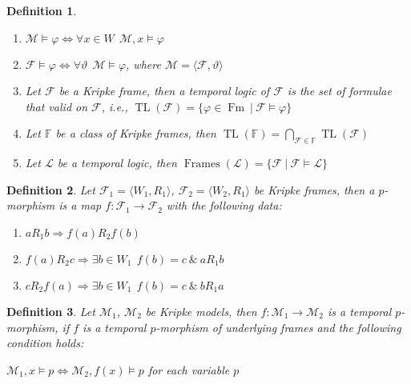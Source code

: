 \documentclass[a4paper]{article}
\theoremstyle{defin}
\newtheorem{defin}{Definition}
\theoremstyle{theorem}
\theoremstyle{prop}
\theoremstyle{lemma}
\theoremstyle{ex}
\theoremstyle{col}
\begin{document}
\begin{defin}
  $ $

  \begin{enumerate}
    \item $\mathcal{M} \models \varphi \Leftrightarrow \forall x \in W \:\: \mathcal{M}, x \models \varphi$
    \item $\mathcal{F} \models \varphi \Leftrightarrow \forall \vartheta \:\: \mathcal{M} \models \varphi$, where $\mathcal{M} = \langle \mathcal{F}, \vartheta \rangle$
    \item Let $\mathcal{F}$ be a Kripke frame, then a temporal logic of $\mathcal{F}$ is the set of formulae that valid on $\mathcal{F}$, i.e., $\operatorname{TL}(\mathcal{F}) = \{ \varphi \in \operatorname{Fm} \: | \: \mathcal{F} \models \varphi \}$
    \item Let $\mathbb{F}$ be a class of Kripke frames, then $\operatorname{TL}(\mathbb{F}) = \bigcap \limits_{\mathcal{F} \in \mathbb{F}} \operatorname{TL}(\mathcal{F})$
    \item Let $\mathcal{L}$ be a temporal logic, then $\operatorname{Frames}(\mathcal{L}) = \{ \mathcal{F} \: | \: \mathcal{F} \models \mathcal{L} \}$
  \end{enumerate}
\end{defin}

\begin{defin}
  Let $\mathcal{F}_1 = \langle W_1, R_1\rangle$, $\mathcal{F}_2 = \langle W_2, R_1 \rangle$ be Kripke frames, then a $p$-morphism is a map $f : \mathcal{F}_1 \to \mathcal{F}_2$ with the following data:
  \begin{enumerate}
    \item $a R_1 b \Rightarrow f(a) R_2 f(b)$
    \item $f(a) R_2 c \Rightarrow \exists b \in W_1 \:\: f(b) = c \: \& \: a R_1 b$
    \item $c R_2 f(a) \Rightarrow \exists b \in W_1 \:\: f(b) = c \: \& \: b R_1 a$
  \end{enumerate}
\end{defin}

\begin{defin}
  Let $\mathcal{M}_1$, $\mathcal{M}_2$ be Kripke models, then $f: \mathcal{M}_1 \to \mathcal{M}_2$ is a temporal $p$-morphism, if $f$ is a temporal $p$-morphism of underlying frames and the following condition holds:

  \begin{center}
    $\mathcal{M}_1, x \models p \Leftrightarrow \mathcal{M}_2, f(x) \models p$ for each variable $p$
  \end{center}
\end{defin}
\end{document}
